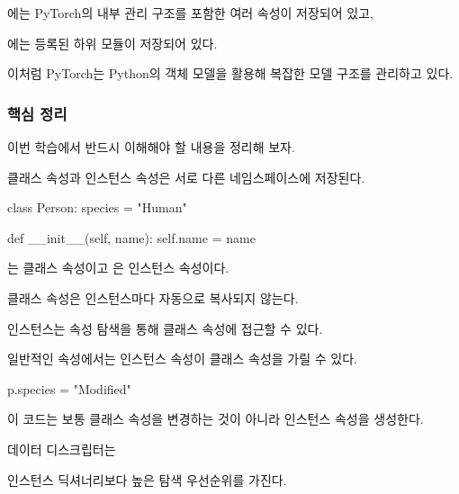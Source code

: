 에는 PyTorch의 내부 관리 구조를 포함한 여러 속성이 저장되어 있고,

에는 등록된 하위 모듈이 저장되어 있다.

이처럼 PyTorch는 Python의 객체 모델을 활용해 복잡한 모델 구조를 관리하고 있다.

\subsubsection{핵심 정리}

이번 학습에서 반드시 이해해야 할 내용을 정리해 보자.

\begin{dhknote}
\begin{dhksmry}[centered]
클래스 속성과 인스턴스 속성은 서로 다른 네임스페이스에 저장된다.
\end{dhksmry}
\end{dhknote}

\begin{dhkcode}
class Person:
    species = "Human"

    def __init__(self, name):
        self.name = name
\end{dhkcode}

는 클래스 속성이고 은 인스턴스 속성이다.

\begin{dhknote}
\begin{dhksmry}[centered]
클래스 속성은 인스턴스마다 자동으로 복사되지 않는다.
\end{dhksmry}
\end{dhknote}

인스턴스는 속성 탐색을 통해 클래스 속성에 접근할 수 있다.

\begin{dhknote}
\begin{dhksmry}[centered]
일반적인 속성에서는 인스턴스 속성이 클래스 속성을 가릴 수 있다.
\end{dhksmry}
\end{dhknote}

\begin{dhkcode}
p.species = "Modified"
\end{dhkcode}

이 코드는 보통 클래스 속성을 변경하는 것이 아니라 인스턴스 속성을 생성한다.

\begin{dhknote}
\begin{dhksmry}[centered]
데이터 디스크립터는 

인스턴스 딕셔너리보다 높은 탐색 우선순위를 가진다.
\end{dhksmry}
\end{dhknote}

